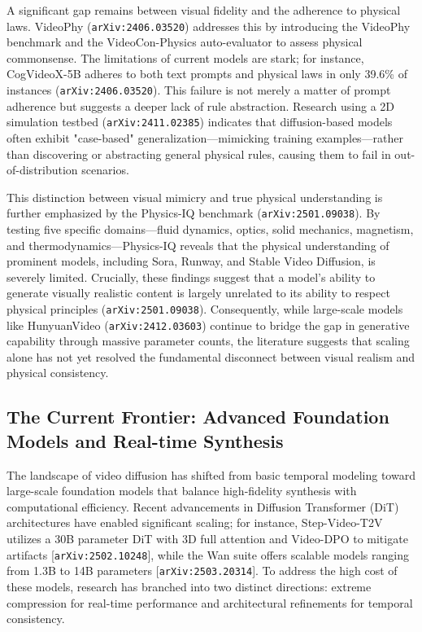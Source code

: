 \documentclass[11pt]{article}
\begin{document}
A significant gap remains between visual fidelity and the adherence to physical laws. VideoPhy (\texttt{arXiv:2406.03520}) addresses this by introducing the VideoPhy benchmark and the VideoCon-Physics auto-evaluator to assess physical commonsense. The limitations of current models are stark; for instance, CogVideoX-5B adheres to both text prompts and physical laws in only 39.6\% of instances (\texttt{arXiv:2406.03520}). This failure is not merely a matter of prompt adherence but suggests a deeper lack of rule abstraction. Research using a 2D simulation testbed (\texttt{arXiv:2411.02385}) indicates that diffusion-based models often exhibit "case-based" generalization—mimicking training examples—rather than discovering or abstracting general physical rules, causing them to fail in out-of-distribution scenarios.

This distinction between visual mimicry and true physical understanding is further emphasized by the Physics-IQ benchmark (\texttt{arXiv:2501.09038}). By testing five specific domains—fluid dynamics, optics, solid mechanics, magnetism, and thermodynamics—Physics-IQ reveals that the physical understanding of prominent models, including Sora, Runway, and Stable Video Diffusion, is severely limited. Crucially, these findings suggest that a model's ability to generate visually realistic content is largely unrelated to its ability to respect physical principles (\texttt{arXiv:2501.09038}). Consequently, while large-scale models like HunyuanVideo (\texttt{arXiv:2412.03603}) continue to bridge the gap in generative capability through massive parameter counts, the literature suggests that scaling alone has not yet resolved the fundamental disconnect between visual realism and physical consistency.

\subsection{The Current Frontier: Advanced Foundation Models and Real-time Synthesis}

The landscape of video diffusion has shifted from basic temporal modeling toward large-scale foundation models that balance high-fidelity synthesis with computational efficiency. Recent advancements in Diffusion Transformer (DiT) architectures have enabled significant scaling; for instance, Step-Video-T2V utilizes a 30B parameter DiT with 3D full attention and Video-DPO to mitigate artifacts [\texttt{arXiv:2502.10248}], while the Wan suite offers scalable models ranging from 1.3B to 14B parameters [\texttt{arXiv:2503.20314}]. To address the high cost of these models, research has branched into two distinct directions: extreme compression for real-time performance and architectural refinements for temporal consistency.
\end{document}
